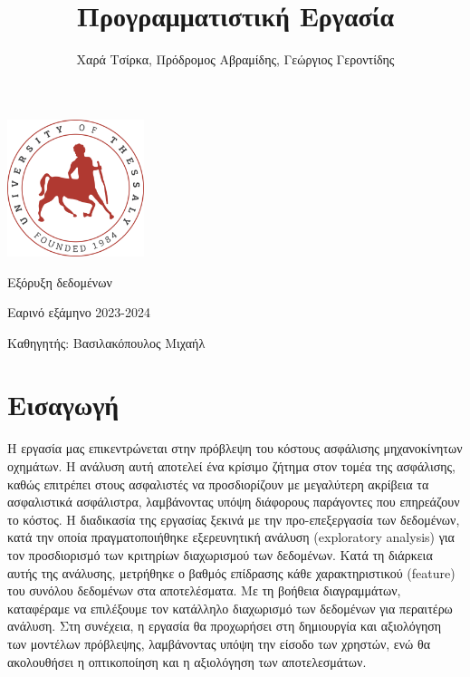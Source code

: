 \documentclass{article}
\title{\Huge Προγραμματιστική Εργασία}
\author {\Large Χαρά Τσίρκα, Πρόδρομος Αβραμίδης, Γεώργιος Γεροντίδης}
\begin{document}
\maketitle
\begin{center}
\vspace{1cm}
\includegraphics[width=0.3\textwidth]{images/uthlogo.png}
\vspace{2cm}
\end{center}
\begin{center}
  \Huge Εξόρυξη δεδομένων \vspace{1cm}

  \Large Εαρινό εξάμηνο 2023-2024 \vspace{1cm}

  \Large Καθηγητής: Βασιλακόπουλος Μιχαήλ
\end{center}

\newpage

\section*{Εισαγωγή}

Η εργασία μας επικεντρώνεται στην πρόβλεψη του κόστους ασφάλισης μηχανοκίνητων οχημάτων. Η ανάλυση αυτή αποτελεί ένα κρίσιμο ζήτημα στον τομέα της ασφάλισης, καθώς επιτρέπει στους ασφαλιστές να προσδιορίζουν με μεγαλύτερη ακρίβεια τα ασφαλιστικά ασφάλιστρα, λαμβάνοντας υπόψη διάφορους παράγοντες που επηρεάζουν το κόστος.
Η διαδικασία της εργασίας ξεκινά με την προ-επεξεργασία των δεδομένων, κατά την οποία πραγματοποιήθηκε εξερευνητική ανάλυση (exploratory analysis) για τον προσδιορισμό των κριτηρίων διαχωρισμού των δεδομένων. Κατά τη διάρκεια αυτής της ανάλυσης, μετρήθηκε ο βαθμός επίδρασης κάθε χαρακτηριστικού (feature) του συνόλου δεδομένων στα αποτελέσματα. Με τη βοήθεια διαγραμμάτων, καταφέραμε να επιλέξουμε τον κατάλληλο διαχωρισμό των δεδομένων για περαιτέρω ανάλυση.
Στη συνέχεια, η εργασία θα προχωρήσει στη δημιουργία και αξιολόγηση των μοντέλων πρόβλεψης, λαμβάνοντας υπόψη την είσοδο των χρηστών, ενώ θα ακολουθήσει η οπτικοποίηση και η αξιολόγηση των αποτελεσμάτων.
\end{document}
